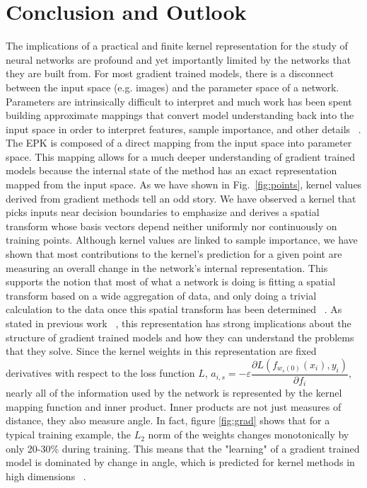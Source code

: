 \section{Conclusion and Outlook} %
The implications of a practical and finite kernel representation for the study of neural networks are profound and yet importantly limited by the networks that they are built from. For most gradient trained models, there is a disconnect between the input space (e.g. images) and the parameter space of a network. Parameters are intrinsically difficult to interpret and much work has been spent building approximate mappings that convert model understanding back into the input space in order to interpret features, sample importance, and other details ~\cite{simonyan2013deep, lundberg2017unified, Selvaraju_2019}. The EPK is composed of a direct mapping from the input space into parameter space. This mapping allows for a much deeper understanding of gradient trained models because the internal state of the method has an exact representation mapped from the input space. As we have shown in Fig.~\ref{fig:points}, kernel values derived from gradient methods tell an odd story. We have observed a kernel that picks inputs near decision boundaries to emphasize and derives a spatial transform whose basis vectors depend neither uniformly nor continuously on training points. Although kernel values are linked to sample importance, we have shown that most contributions to the kernel's prediction for a given point are measuring an overall change in the network's internal representation. This supports the notion that most of what a network is doing is fitting a spatial transform based on a wide aggregation of data, and only doing a trivial calculation to the data once this spatial transform has been determined ~\cite{chizat2020maxmargin}. 
As stated in previous work ~\cite{domingos2020}, this representation has strong implications about the structure of gradient trained models and how they can understand the problems that they solve. Since the kernel weights in this representation are fixed derivatives with respect to the loss function $L$, $a_{i, s} = -\varepsilon  \dfrac{\partial L(f_{w_s(0)}(x_i),  y_i)}{\partial f_i}$, nearly all of the information used by the network is represented by the kernel mapping function and inner product. Inner products are not just measures of distance, they also measure angle. In fact, figure \ref{fig:grad} shows that for a typical training example, the $L_2$ norm of the weights changes monotonically by only 20-30\% during training. This means that the "learning" of a gradient trained model is dominated by change in angle, which is predicted for kernel methods in high dimensions ~\cite{hardle2004nonparametric}.

